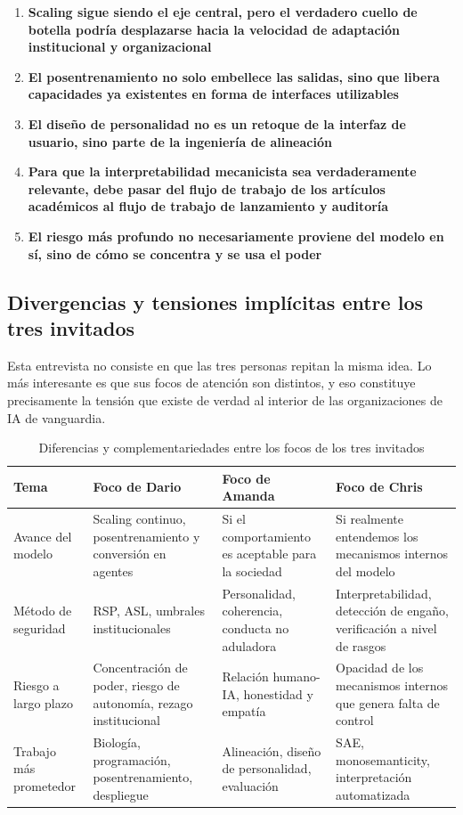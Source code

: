 \begin{enumerate}
    \item \textbf{Scaling sigue siendo el eje central, pero el verdadero cuello de botella podría desplazarse hacia la velocidad de adaptación institucional y organizacional}
    \item \textbf{El posentrenamiento no solo embellece las salidas, sino que libera capacidades ya existentes en forma de interfaces utilizables}
    \item \textbf{El diseño de personalidad no es un retoque de la interfaz de usuario, sino parte de la ingeniería de alineación}
    \item \textbf{Para que la interpretabilidad mecanicista sea verdaderamente relevante, debe pasar del flujo de trabajo de los artículos académicos al flujo de trabajo de lanzamiento y auditoría}
    \item \textbf{El riesgo más profundo no necesariamente proviene del modelo en sí, sino de cómo se concentra y se usa el poder}
\end{enumerate}

\subsection{Divergencias y tensiones implícitas entre los tres invitados}

Esta entrevista no consiste en que las tres personas repitan la misma idea. Lo más interesante es que sus focos de atención son distintos, y eso constituye precisamente la tensión que existe de verdad al interior de las organizaciones de IA de vanguardia.

\begin{table}[H]
\centering
\begin{tabular}{p{} p{} p{} p{}}
\toprule
Tema & Foco de Dario & Foco de Amanda & Foco de Chris \\
\midrule
Avance del modelo & Scaling continuo, posentrenamiento y conversión en agentes & Si el comportamiento es aceptable para la sociedad & Si realmente entendemos los mecanismos internos del modelo \\
Método de seguridad & RSP, ASL, umbrales institucionales & Personalidad, coherencia, conducta no aduladora & Interpretabilidad, detección de engaño, verificación a nivel de rasgos \\
Riesgo a largo plazo & Concentración de poder, riesgo de autonomía, rezago institucional & Relación humano-IA, honestidad y empatía & Opacidad de los mecanismos internos que genera falta de control \\
Trabajo más prometedor & Biología, programación, posentrenamiento, despliegue & Alineación, diseño de personalidad, evaluación & SAE, monosemanticity, interpretación automatizada \\
\bottomrule
\end{tabular}
\caption{Diferencias y complementariedades entre los focos de los tres invitados}
\end{table}

